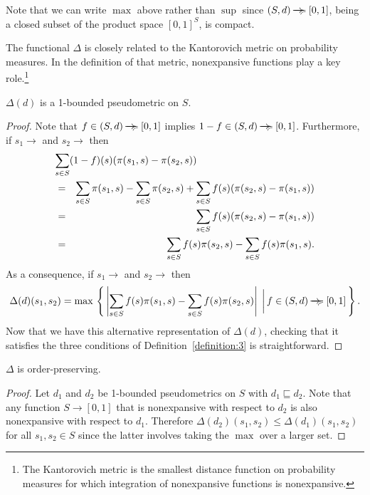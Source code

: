 \documentclass{LMCS}
\newcommand{\ndi}{\mathbin{\raisebox{0.15ex}{-\hspace{-0.2em}-\hspace{-0.2em}-\hspace{-0.2em}-\hspace{-0.2em}-\hspace{-0.2em}-}\hspace{-0.7em}\succcurlyeq}}
\newcommand{\bigmid}{\; \bigg| \,}
\begin{document}
Note that we can write $\max$ above rather than $\sup$
since $(S, d) \ndi [0, 1]$, being a closed subset of the product space
$[0,1]^S$, is compact.

The functional $\Delta$ is closely related to the Kantorovich metric 
\cite{K42:dan} on probability measures.  In the definition of that
metric, nonexpansive functions play a key role.\footnote{The Kantorovich metric is the smallest distance function
on probability measures for which integration of nonexpansive
functions is nonexpansive.}

\begin{prop}
$\Delta(d)$ is a 1-bounded pseudometric on $S$.
\end{prop}
\begin{proof}
Note that $f \in (S, d) \ndi [0, 1]$ implies $1 - f \in (S, d) \ndi [0, 1]$.
Furthermore, if $s_1 \rightarrow$ and $s_2 \rightarrow$ then
\begin{eqnarray*}
\lefteqn{\sum_{s \in S} (1 - f)(s)(\pi(s_1, s) - \pi(s_2, s))}\\
& = & \sum_{s \in S} \pi(s_1, s) - \sum_{s \in S} \pi(s_2, s) + \sum_{s \in S} f(s) (\pi(s_2, s) - \pi(s_1, s))\\
& = & \sum_{s \in S} f(s) (\pi(s_2, s) - \pi(s_1, s))\\
& = & \sum_{s \in S} f(s) \pi(s_2, s) - \sum_{s \in S} f(s) \pi(s_1, s).
\end{eqnarray*}
As a consequence, if $s_1 \rightarrow$ and $s_2 \rightarrow$ then
\begin{displaymath}
\Delta(d)(s_1, s_2) =
\max\, \left \{\, \left | \sum_{s \in S} f(s) \pi(s_1, s) - \sum_{s \in S} f(s) \pi(s_2, s) \right | \bigmid f \in (S, d) \ndi [0, 1] \, \right \}.
\end{displaymath}
Now that we have this alternative representation of $\Delta(d)$, 
checking that it satisfies the three conditions of Definition~\ref{definition:3}
is straightforward.
\end{proof}

\begin{prop}
\label{proposition:5}
$\Delta$ is order-preserving.
\end{prop}
\begin{proof}
Let $d_1$ and $d_2$ be 1-bounded pseudometrics on $S$ with $d_1 \sqsubseteq d_2$.
Note that any function $S \rightarrow [0,1]$ that is nonexpansive with
respect to $d_2$ is also nonexpansive with respect to $d_1$.  Therefore
$\Delta(d_2)(s_1,s_2) \leq \Delta(d_1)(s_1,s_2)$ for all $s_1,s_2 \in
S$ since the latter involves taking the $\max$ over a larger set.
\end{proof}
\end{document}
